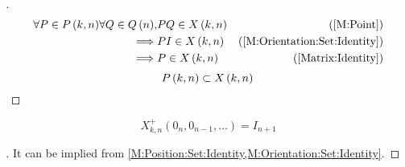 \documentclass[../main.tex]{subfiles}
\begin{document}
\begin{proof}[]
    \begin{align*}
        \forall{P \in P\left(k,n\right)}
        \forall{Q\in Q\left(n\right)},
                                  &
        P Q \in X\left(k,n\right) & \text{(\cref{M:Point})}                    \\
        \implies                  &
        P I \in X\left(k,n\right) & \text{(\cref{M:Orientation:Set:Identity})} \\
        \implies                  &
        P \in X\left(k,n\right)   & \text{(\cref{Matrix:Identity})}
    \end{align*}
    \begin{equation*}
        P\left(k,n\right)\subset X\left(k,n\right) \qedhere
    \end{equation*}
\end{proof}
\begin{corollary}\label{M:Point:Set:Identity}
    \begin{equation*}
        X^{+}_{k,n}
        \left(0_{n}, 0_{n-1}, \dots\right)
        =
        I_{n+1}
    \end{equation*}
\end{corollary}
\begin{proof}[]
    It can be implied from \cref{M:Position:Set:Identity,M:Orientation:Set:Identity}.
\end{proof}
\end{document}
